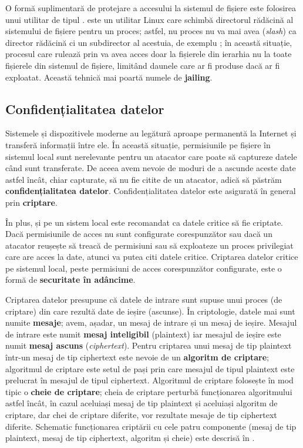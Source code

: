 O formă suplimentară de protejare a accesului la sistemul de fișiere este folosirea unui utilitar de tipul .  este un utilitar Linux care schimbă directorul rădăcină al sistemului de fișiere pentru un proces; astfel, nu proces nu va mai avea \file{/} (\textit{slash}) ca director rădăcină ci un subdirector al acestuia, de exemplu ; în această situație, procesul care rulează prin  va avea acces doar la fișierele din ierarhia  nu la toate fișierele din sistemul de fișiere, limitând daunele care ar fi produse dacă ar fi exploatat. Această tehnică mai poartă numele de \textbf{jailing}.

\subsection{Confidențialitatea datelor}
\label{sec:sec:data:confidentiality}

Sistemele și dispozitivele moderne au legătură aproape permanentă la Internet și transferă informații între ele. În această situație, permisiunile pe fișiere în sistemul local sunt nerelevante pentru un atacator care poate să captureze datele când sunt transferate. De aceea avem nevoie de moduri de a ascunde aceste date astfel încât, chiar capturate, să nu fie citite de un atacator, adică să păstrăm \textbf{confidențialitatea datelor}. Confidențialitatea datelor este asigurată în general prin \textbf{criptare}.

În plus, și pe un sistem local este recomandat ca datele critice să fie criptate. Dacă permisiunile de acces nu sunt configurate corespunzător sau dacă un atacator reușește să treacă de permisiuni sau să exploateze un proces privilegiat care are acces la date, atunci va putea citi datele critice. Criptarea datelor critice pe sistemul local, peste permisiuni de acces corespunzător configurate, este o formă de \textbf{securitate în adâncime}.

Criptarea datelor presupune că datele de intrare sunt supuse unui proces (de criptare) din care rezultă date de ieșire (ascunse). În criptologie, datele mai sunt numite \textbf{mesaje}; avem, așadar, un mesaj de intrare și un mesaj de ieșire. Mesajul de intrare este numit \textbf{mesaj inteligibil} (plaintext) iar mesajul de ieșire este numit \textbf{mesaj ascuns} (\textit{ciphertext}). Pentru criptarea unui mesaj de tip plaintext într-un mesaj de tip ciphertext este nevoie de un \textbf{algoritm de criptare}; algoritmul de criptare este setul de pași prin care mesajul de tipul plaintext este prelucrat în mesajul de tipul ciphertext. Algoritmul de criptare folosește în mod tipic o \textbf{cheie de criptare}; cheia de criptare perturbă funcționarea algoritmului astfel încât, în cazul aceluiași mesaj de tip plaintext și aceluiași algoritm de criptare, dar chei de criptare diferite, vor rezultate mesaje de tip ciphertext diferite. Schematic funcționarea criptării cu cele patru componente (mesaj de tip plaintext, mesaj de tip ciphertext, algoritm și cheie) este descrisă în .

